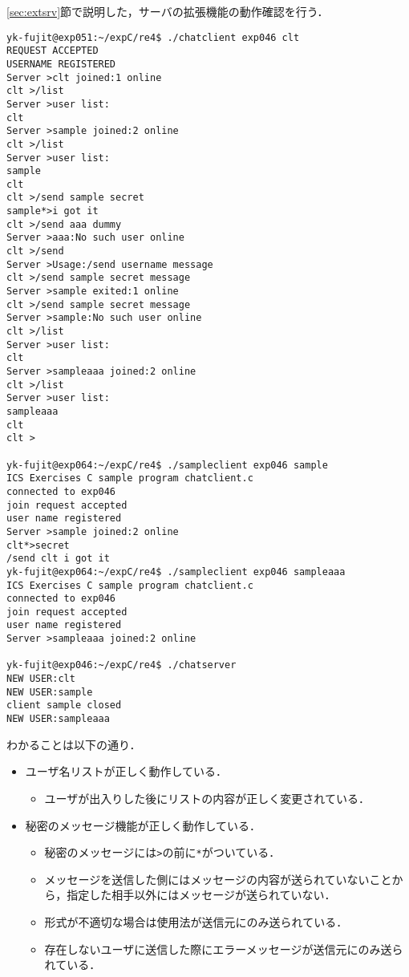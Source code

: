 \documentclass[a4j,10pt,titlepage]{jsarticle}
\begin{document}
\ref{sec:extsrv}節で説明した，サーバの拡張機能の動作確認を行う．
\begin{verbatim}
yk-fujit@exp051:~/expC/re4$ ./chatclient exp046 clt
REQUEST ACCEPTED
USERNAME REGISTERED
Server >clt joined:1 online
clt >/list
Server >user list:
clt
Server >sample joined:2 online
clt >/list
Server >user list:
sample
clt
clt >/send sample secret
sample*>i got it
clt >/send aaa dummy
Server >aaa:No such user online
clt >/send
Server >Usage:/send username message
clt >/send sample secret message
Server >sample exited:1 online
clt >/send sample secret message
Server >sample:No such user online
clt >/list
Server >user list:
clt
Server >sampleaaa joined:2 online
clt >/list
Server >user list:
sampleaaa
clt
clt >

yk-fujit@exp064:~/expC/re4$ ./sampleclient exp046 sample
ICS Exercises C sample program chatclient.c
connected to exp046
join request accepted
user name registered
Server >sample joined:2 online
clt*>secret
/send clt i got it
yk-fujit@exp064:~/expC/re4$ ./sampleclient exp046 sampleaaa
ICS Exercises C sample program chatclient.c
connected to exp046
join request accepted
user name registered
Server >sampleaaa joined:2 online

yk-fujit@exp046:~/expC/re4$ ./chatserver 
NEW USER:clt
NEW USER:sample
client sample closed
NEW USER:sampleaaa
\end{verbatim}
わかることは以下の通り．
\begin{itemize}
  \item ユーザ名リストが正しく動作している．
  \begin{itemize}
    \item ユーザが出入りした後にリストの内容が正しく変更されている．
  \end{itemize}
  \item 秘密のメッセージ機能が正しく動作している．
  \begin{itemize}
    \item 秘密のメッセージには\verb|>|の前に\verb|*|がついている．
    \item メッセージを送信した側にはメッセージの内容が送られていないことから，指定した相手以外にはメッセージが送られていない．
    \item 形式が不適切な場合は使用法が送信元にのみ送られている．
    \item 存在しないユーザに送信した際にエラーメッセージが送信元にのみ送られている．
  \end{itemize}
\end{itemize}
\end{document}
